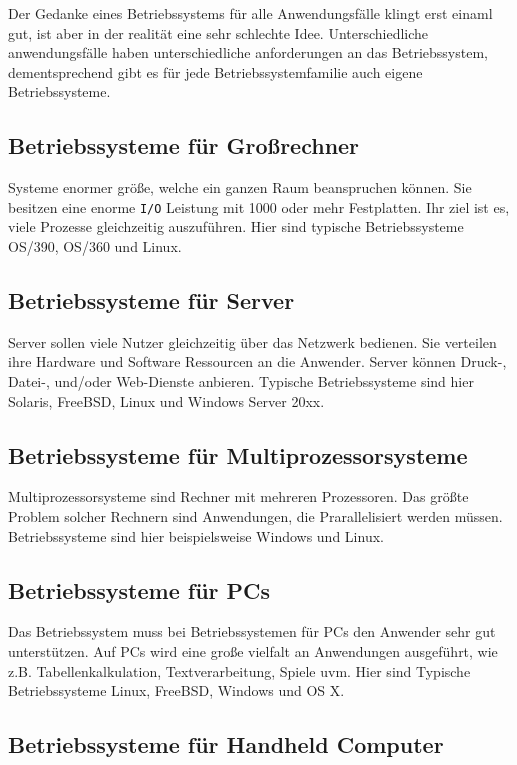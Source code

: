 Der Gedanke eines Betriebssystems für alle Anwendungsfälle klingt erst einaml
gut, ist aber in der realität eine sehr schlechte Idee. Unterschiedliche
anwendungsfälle haben unterschiedliche anforderungen an das Betriebssystem,
dementsprechend gibt es für jede Betriebssystemfamilie auch eigene
Betriebssysteme.

\subsection{Betriebssysteme für Großrechner}

Systeme enormer größe, welche ein ganzen Raum beanspruchen können. Sie besitzen
eine enorme \texttt{I/O} Leistung mit 1000 oder mehr Festplatten. Ihr ziel ist
es, viele Prozesse gleichzeitig auszuführen. Hier sind typische Betriebssysteme
OS/390, OS/360 und Linux.

\subsection{Betriebssysteme für Server}

Server sollen viele Nutzer gleichzeitig über das Netzwerk bedienen. Sie
verteilen ihre Hardware und Software Ressourcen an die Anwender. Server können
Druck-, Datei-, und/oder Web-Dienste anbieren. Typische Betriebssysteme sind
hier Solaris, FreeBSD, Linux und Windows Server 20xx.

\subsection{Betriebssysteme für Multiprozessorsysteme}

Multiprozessorsysteme sind Rechner mit mehreren Prozessoren. Das größte Problem
solcher Rechnern sind Anwendungen, die Prarallelisiert werden müssen.
Betriebssysteme sind hier beispielsweise Windows und Linux.

\subsection{Betriebssysteme für PCs}

Das Betriebssystem muss bei Betriebssystemen für PCs den Anwender sehr gut
unterstützen. Auf PCs wird eine große vielfalt an Anwendungen ausgeführt, wie
z.B. Tabellenkalkulation, Textverarbeitung, Spiele uvm. Hier sind Typische
Betriebssysteme Linux, FreeBSD, Windows und OS X.

\subsection{Betriebssysteme für Handheld Computer}

